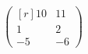 \documentclass[a4paper]{article}
\begin{document}
\[
\begin{pmatrix*}[r]
10&11\\
1&2\\
-5&-6
\end{pmatrix*}
\]
\end{document}
